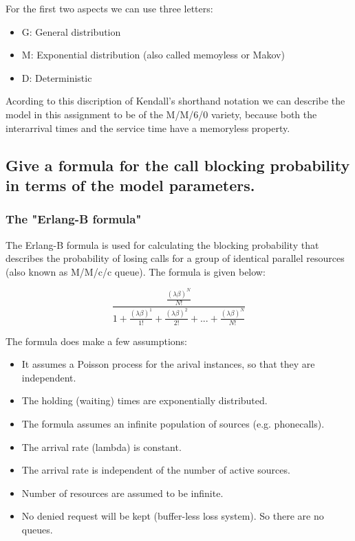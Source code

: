 \documentclass[11pt]{article}
\providecommand{\tightlist}{%
      \setlength{\itemsep}{0pt}\setlength{\parskip}{0pt}}
\begin{document}
For the first two aspects we can use three letters:

\begin{itemize}
\tightlist
\item
  G: General distribution
\item
  M: Exponential distribution (also called memoyless or Makov)
\item
  D: Deterministic
\end{itemize}

Acording to this discription of Kendall's shorthand notation we can
describe the model in this assignment to be of the M/M/6/0 variety,
because both the interarrival times and the service time have a
memoryless property.

    \subsection{Give a formula for the call blocking probability in terms of
the model
parameters.}\label{give-a-formula-for-the-call-blocking-probability-in-terms-of-the-model-parameters.}

    \subsubsection{The "Erlang-B formula"}\label{the-erlang-b-formula}

The Erlang-B formula is used for calculating the blocking probability
that describes the probability of losing calls for a group of identical
parallel resources (also known as M/M/c/c queue). The formula is given
below:

\[ \frac{\frac{(\lambda\beta)^N}{N!}}{1 + \frac{(\lambda\beta)^1}{1!} + \frac{(\lambda\beta)^2}{2!} + ... + \frac{(\lambda\beta)^N}{N!}} \]

The formula does make a few assumptions:

\begin{itemize}
\tightlist
\item
  It assumes a Poisson process for the arival instances, so that they
  are independent.
\item
  The holding (waiting) times are exponentially distributed.
\item
  The formula assumes an infinite population of sources (e.g.
  phonecalls).
\item
  The arrival rate (lambda) is constant.
\item
  The arrival rate is independent of the number of active sources.
\item
  Number of resources are assumed to be infinite.
\item
  No denied request will be kept (buffer-less loss system). So there are
  no queues.
\end{itemize}
\end{document}
